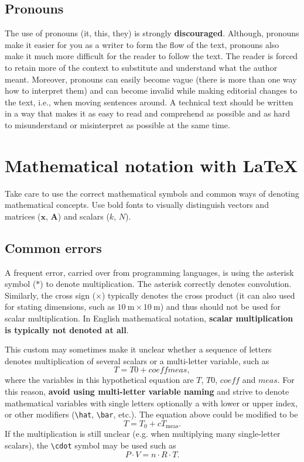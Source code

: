 \subsection{Pronouns}

The use of pronouns (it, this, they) is strongly \textbf{discouraged}.
Although, pronouns make it easier for you as a writer to form the flow of the text, pronouns also make it much more difficult for the reader to follow the text.
The reader is forced to retain more of the context to substitute and understand what the author meant.
Moreover, pronouns can easily become vague (there is more than one way how to interpret them) and can become invalid while making editorial changes to the text, i.e., when moving sentences around.
A technical text should be written in a way that makes it as easy to read and comprehend as possible and as hard to misunderstand or misinterpret as possible at the same time.

\section{Mathematical notation with LaTeX}

Take care to use the correct mathematical symbols and common ways of denoting mathematical concepts.
Use bold fonts to visually distinguish vectors and matrices ($\mathbf{x}$, $\mathbf{A}$) and scalars ($k$, $N$).

\subsection{Common errors}
A frequent error, carried over from programming languages, is using the asterisk symbol ($*$) to denote multiplication.
The asterisk correctly denotes convolution.
Similarly, the cross sign ($\times$) typically denotes the cross product (it can also used for stating dimensions, such as $\SI{10}{\metre} \times \SI{10}{\metre}$) and thus should not be used for scalar multiplication.
In English mathematical notation, \textbf{scalar multiplication is typically not denoted at all}.

This custom may sometimes make it unclear whether a sequence of letters denotes multiplication of several scalars or a multi-letter variable, such as
{\color{red}%
\begin{equation}
  T = T0 + coeff meas,
\end{equation}
where the variables in this hypothetical equation are $T$, $T0$, $coeff$ and $meas$.}
For this reason, \textbf{avoid using multi-letter variable naming} and strive to denote mathematical variables with single letters optionally a with lower or upper index, or other modifiers (\texttt{\textbackslash{}hat}, \texttt{\textbackslash{}bar}, etc.).
The equation above could be modified to be
\begin{equation}
  T = T_0 + cT_{\text{meas}}.
\end{equation}
If the multiplication is still unclear (e.g. when multiplying many single-letter scalars), the \texttt{\textbackslash{}cdot} symbol may be used such as
\begin{equation}
  P\cdot V = n\cdot R\cdot T.
\end{equation}

